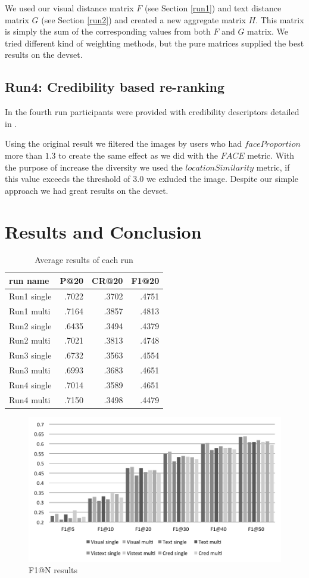 \documentclass{acm_proc_article-me}
\begin{document}
We used our visual distance matrix $F$ (see Section \ref{run1}) and text distance matrix $G$ (see Section \ref{run2}) and created a new aggregate matrix $H$. This matrix is simply the sum of the corresponding values from both $F$ and $G$ matrix. We tried different kind of weighting methods, but the pure matrices supplied the best results on the devset.

\subsection{Run4: Credibility based re-ranking}
In the fourth run participants were provided with credibility descriptors detailed in \cite{Task2015}.

Using the original result we filtered the images by users who had $faceProportion$ more than $1.3$ to create the same effect as we did with the $FACE$ metric. With the purpose of increase the diversity we used the $locationSimilarity$ metric, if this value exceeds the threshold of $3.0$ we exluded the image. Despite our simple approach we had great results on the devset.

\section{Results and Conclusion}

\begin{table}[h]
	\centering
\begin{tabular}{|l|r|r|r|}
	\hline 
	run name & P@20 & CR@20 & F1@20\tabularnewline
	\hline 
	\hline 
	Run1 single & .7022 & .3702 & .4751\tabularnewline
	\hline 
	Run1 multi & .7164 & .3857 & .4813\tabularnewline
	\hline 
	Run2 single & .6435 & .3494 & .4379\tabularnewline
	\hline 
	Run2 multi & .7021 & .3813 & .4748\tabularnewline
	\hline 
	Run3 single & .6732 & .3563 & .4554\tabularnewline
	\hline 
	Run3 multi & .6993 & .3683 & .4651\tabularnewline
	\hline 
	Run4 single & .7014 & .3589 & .4651\tabularnewline
	\hline 
	Run4 multi & .7150 & .3498 & .4479\tabularnewline
	\hline
\end{tabular}
\label{table:results}
\caption{Average results of each run}
\end{table}

\begin{figure}[h]
\includegraphics[width=1.0\linewidth]{f1}
\caption{F1@N results}
\label{fig:f1}
\end{figure}
\end{document}
